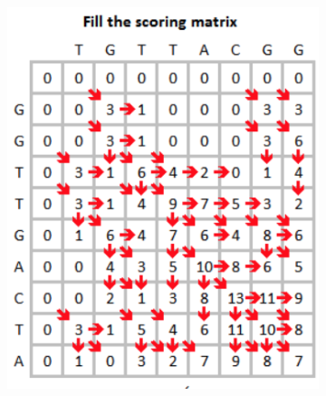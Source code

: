 \begin{figure}[h!]
     \centering
     \begin{subfigure}[b]{0.45\textwidth}
         \centering
         \includegraphics[width=\textwidth]{img/Smith_waterman_fill_matrix.png}
     \end{subfigure}
     \hfill
     \begin{subfigure}[b]{0.45\textwidth}
         \centering

\end{subfigure}
\end{figure}
